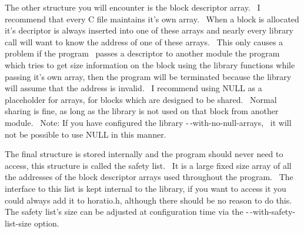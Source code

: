 \documentclass{article}
\begin{document}
\par The other structure you will encounter is the block descriptor
array.~
I recommend that every C file maintains it's own array.~ When a
block
is allocated it's decriptor is always inserted into one of these arrays
and nearly every library call will want to know the address of one of
these
arrays.~ This only causes a problem if the program~ passes a
descriptor to another module the program which tries to get size
information
on the block using the library functions while passing it's own array,
then the program will be terminated because the library will assume
that
the address is invalid.~ I recommend using NULL as a placeholder
for
arrays, for blocks which are designed to be shared.~ Normal
sharing
is fine, as long as the library is not used on that block from another
module.~ Note: If you have configured the library
-$\,$-with-no-null-arrays,~ it will not be possible to use NULL in
this manner.\\

\par The final structure is stored internally and the program should
never
need to access, this structure is called the safety list.~ It is a
large fixed size array of all the addresses of the block descriptor
arrays
used throughout the program.~ The interface to this list is kept
internal
to the library, if you want to access it you could always add it to
horatio.h,
although there should be no reason to do this.~ The safety list's
size can be adjusted at configuration time via the
-$\,$-with-safety-list-size option.\\
\end{document}
